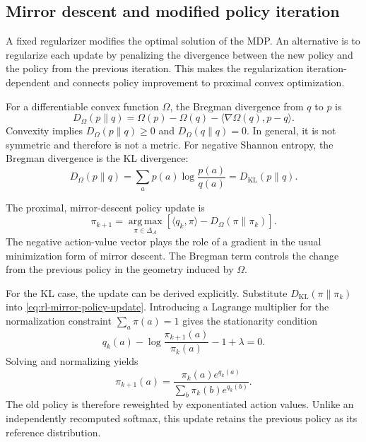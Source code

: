 \subsection{Mirror descent and modified policy iteration}
\label{subsec:rl-mirror-descent-mdpi}

A fixed regularizer modifies the optimal solution of the MDP. An alternative
is to regularize each update by penalizing the divergence between the new policy
and the policy from the previous iteration. This makes the regularization
iteration-dependent and connects policy improvement to proximal convex
optimization.

For a differentiable convex function $\Omega$, the Bregman divergence from
$q$ to $p$ is
\begin{equation}
    D_\Omega(p\|q)
    =\Omega(p)-\Omega(q)
     -\langle\nabla\Omega(q),p-q\rangle.
    \label{eq:rl-bregman-divergence}
\end{equation}
Convexity implies $D_\Omega(p\|q)\geq0$ and
$D_\Omega(q\|q)=0$. In general, it is not symmetric and therefore is not a
metric. For negative Shannon entropy, the Bregman divergence is the KL
divergence:
\begin{equation}
    D_\Omega(p\|q)
    =\sum_a p(a)\log\frac{p(a)}{q(a)}
    =D_{\mathrm{KL}}(p\|q).
    \label{eq:rl-bregman-kl}
\end{equation}

The proximal, mirror-descent policy update is
\begin{equation}
    \pi_{k+1}
    =\operatorname*{arg\,max}_{\pi\in\Delta_{\mathcal A}}
      \left[\langle q_k,\pi\rangle
      -D_\Omega(\pi\|\pi_k)\right].
    \label{eq:rl-mirror-policy-update}
\end{equation}
The negative action-value vector plays the role of a gradient in the usual
minimization form of mirror descent. The Bregman term controls the change from
the previous policy in the geometry induced by $\Omega$.

For the KL case, the update can be derived explicitly. Substitute
$D_{\mathrm{KL}}(\pi\|\pi_k)$ into \cref{eq:rl-mirror-policy-update}.
Introducing a Lagrange multiplier for the normalization constraint
$\sum_a\pi(a)=1$ gives the stationarity condition
\begin{equation}
    q_k(a)-\log\frac{\pi_{k+1}(a)}{\pi_k(a)}-1+\lambda=0.
    \label{eq:rl-kl-mirror-stationarity}
\end{equation}
Solving and normalizing yields
\begin{equation}
    \pi_{k+1}(a)
    =\frac{\pi_k(a)e^{q_k(a)}}
           {\sum_b\pi_k(b)e^{q_k(b)}}.
    \label{eq:rl-kl-mirror-update}
\end{equation}
The old policy is therefore reweighted by exponentiated action values. Unlike
an independently recomputed softmax, this update retains the previous policy
as its reference distribution.


